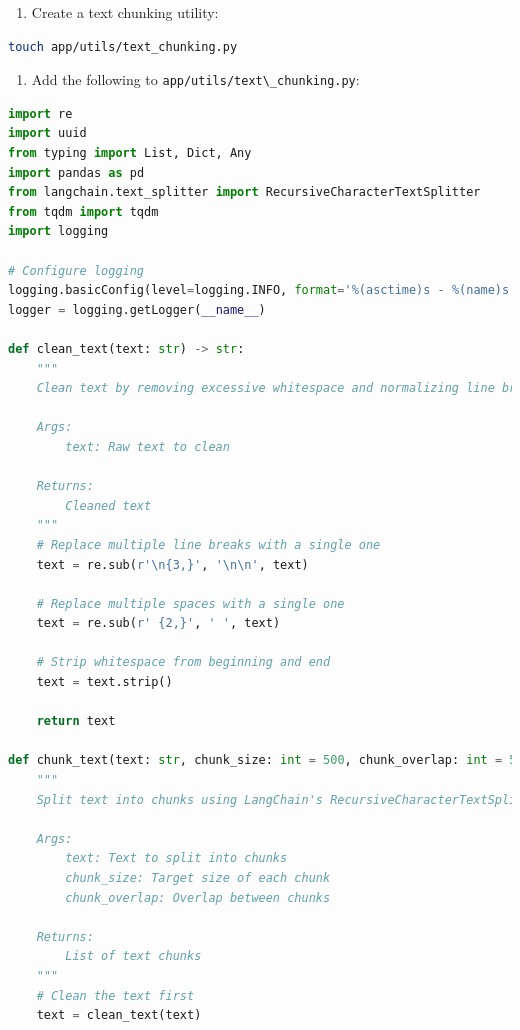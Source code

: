\documentclass[
  screen,review,acmlarge]{acmart}
\newcommand{\passthrough}[1]{#1}
\providecommand{\tightlist}{%
  \setlength{\itemsep}{0pt}\setlength{\parskip}{0pt}}
\begin{document}
\begin{enumerate}
\def\labelenumi{\arabic{enumi}.}
\setcounter{enumi}{2}
\tightlist
\item
  Create a text chunking utility:
\end{enumerate}

\begin{lstlisting}[language=bash]
touch app/utils/text_chunking.py
\end{lstlisting}

\begin{enumerate}
\def\labelenumi{\arabic{enumi}.}
\setcounter{enumi}{3}
\tightlist
\item
  Add the following to \passthrough{\lstinline!app/utils/text\_chunking.py!}:
\end{enumerate}

\begin{lstlisting}[language=Python]
import re
import uuid
from typing import List, Dict, Any
import pandas as pd
from langchain.text_splitter import RecursiveCharacterTextSplitter
from tqdm import tqdm
import logging

# Configure logging
logging.basicConfig(level=logging.INFO, format='%(asctime)s - %(name)s - %(levelname)s - %(message)s')
logger = logging.getLogger(__name__)

def clean_text(text: str) -> str:
    """
    Clean text by removing excessive whitespace and normalizing line breaks.
    
    Args:
        text: Raw text to clean
        
    Returns:
        Cleaned text
    """
    # Replace multiple line breaks with a single one
    text = re.sub(r'\n{3,}', '\n\n', text)
    
    # Replace multiple spaces with a single one
    text = re.sub(r' {2,}', ' ', text)
    
    # Strip whitespace from beginning and end
    text = text.strip()
    
    return text

def chunk_text(text: str, chunk_size: int = 500, chunk_overlap: int = 50) -> List[str]:
    """
    Split text into chunks using LangChain's RecursiveCharacterTextSplitter.
    
    Args:
        text: Text to split into chunks
        chunk_size: Target size of each chunk
        chunk_overlap: Overlap between chunks
        
    Returns:
        List of text chunks
    """
    # Clean the text first
    text = clean_text(text)
    

\end{lstlisting}
\end{document}
